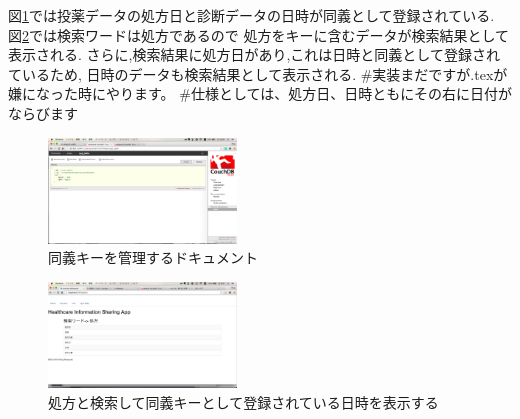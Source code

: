 	図\ref{relation}では投薬データの処方日と診断データの日時が同義として登録されている.
	図\ref{relationApp}では検索ワードは処方であるので
	処方をキーに含むデータが検索結果として表示される.
	さらに,検索結果に処方日があり,これは日時と同義として登録されているため,
	日時のデータも検索結果として表示される.
	#実装まだですが.texが嫌になった時にやります。
	#仕様としては、処方日、日時ともにその右に日付がならびます

	\begin{figure}[htbp]
			\includegraphics[width=5cm, bb=0 0 437 688]{./gazou/relation.png}
		\caption{同義キーを管理するドキュメント}
		\label{relation}
	\end{figure}

	\begin{figure}[htbp]
			\includegraphics[width=5cm, bb=0 0 437 688]{./gazou/relationApp.png}
		\caption{処方と検索して同義キーとして登録されている日時を表示する}
		\label{relationApp}
	\end{figure}
